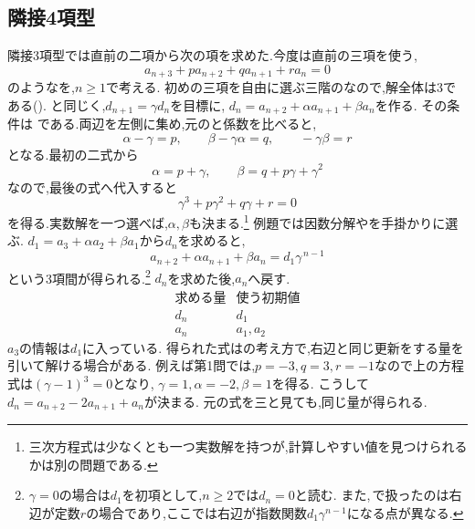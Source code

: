\subsection{隣接4項型}\label{節：隣接4項間漸化式型}
隣接3項型では直前の二項から次の項を求めた.今度は直前の三項を使う,
\[
  a_{n+3}+pa_{n+2}+qa_{n+1}+ra_n=0
\]
のようなを,$n\ge1$で考える.
初めの三項を自由に選ぶ三階のなので,解全体は3である().
と同じく,$d_{n+1}=\gamma d_n$を目標に,
$d_n=a_{n+2}+\alpha a_{n+1}+\beta a_n$を作る.
その条件は
\BookMathLayout{\[
  a_{n+3}+\alpha a_{n+2}+\beta a_{n+1}=\gamma \left(a_{n+2}+\alpha a_{n+1}+\beta a_{n}\right)
\]}{
\[
\begin{aligned}
a_{n+3}+\alpha a_{n+2}+\beta a_{n+1}\\
{}=\gamma\left(a_{n+2}+\alpha a_{n+1}+\beta a_n\right)
\end{aligned}
\]
}
である.両辺を左側に集め,元のと係数を比べると,
\[
  \alpha-\gamma=p,\qquad
  \beta-\gamma\alpha=q,\qquad
  -\gamma\beta=r
\]
となる.最初の二式から
\[
  \alpha=p+\gamma,\qquad
  \beta=q+p\gamma+\gamma^2
\]
なので,最後の式へ代入すると
\[
  \gamma^3+p\gamma^2+q\gamma+r=0
\]
を得る.実数解を一つ選べば,$\alpha,\beta$も決まる.\footnote{三次方程式は少なくとも一つ実数解を持つが,計算しやすい値を見つけられるかは別の問題である.}
例題では因数分解やを手掛かりに選ぶ.
$d_1=a_3+\alpha a_2+\beta a_1$から$d_n$を求めると,
\[
  a_{n+2}+\alpha a_{n+1}+\beta a_n=d_1\gamma^{\,n-1}
\]
という3項間が得られる.\footnote{$\gamma=0$の場合は$d_1$を初項として,$n\ge2$では$d_n=0$と読む.
また,\,で扱ったのは右辺が定数$r$の場合であり,ここでは右辺が指数関数$d_1\gamma^{n-1}$になる点が異なる.}
$d_n$を求めた後,$a_n$へ戻す.
\[
  \begin{array}{c|c}
    \text{求める量}&\text{使う初期値}\\ \hline
    d_n&d_1\\
    a_n&a_1,a_2
  \end{array}
\]
$a_3$の情報は$d_1$に入っている.
得られた式はの考え方で,右辺と同じ更新をする量を引いて解ける場合がある.
例えば第1問では,$p=-3,q=3,r=-1$なので上の方程式は$(\gamma-1)^3=0$となり,
$\gamma=1,\alpha=-2,\beta=1$を得る.
こうして$d_n=a_{n+2}-2a_{n+1}+a_n$が決まる.
元の式を\mbox{三}と見ても,同じ量が得られる.

